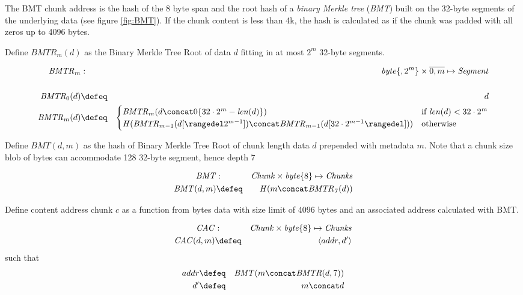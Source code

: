 The BMT chunk address is the hash of the 8 byte span and the root hash of a \emph{binary Merkle tree} (\emph{BMT}) built on the 32-byte segments of the underlying data (see figure \ref{fig:BMT}). If the chunk content is less than 4k, the hash is calculated as if the chunk was padded with all zeros up to 4096 bytes.


\begin{definition}
\label{def:bmtroot}
Define  $\mathit{BMTR}_m(d)$ as the Binary Merkle Tree Root of data $d$ fitting in at most $2^m$ 32-byte segments.

\begin{eqnarray}
\mathit{BMTR}_m&: &\mathit{byte}\{,2^{m}\}\times\overline{0,m} \mapsto \mathit{Segment} 
\\\\
\mathit{BMTR}_0(d) &\defeq &d\\
\mathit{BMTR}_m(d) &\defeq &\begin{cases}
\mathit{BMTR}_m(d\concat 0\{32\cdot 2^m-\mathit{len}(d)\})& \text{if }\mathit{len}(d)<32\cdot 2^{m} \\
\mathit{H}(\mathit{BMTR}_{m-1}(d[\rangedel 2^{m-1}])\concat  \mathit{BMTR}_{m-1}(d[32\cdot 2^{m-1}\rangedel])) & \text{otherwise }
\end{cases}
\end{eqnarray}
\end{definition}

\begin{definition}
\label{def:bmt}
Define  $\mathit{BMT}(d,m)$ as the hash of Binary Merkle Tree Root of chunk length data $d$ prepended with metadata $m$. Note that a chunk size blob of bytes can accommodate 128 32-byte segment, hence  depth $7$

\begin{eqnarray}
\mathit{BMT} &:&\mathit{Chunk}\times\mathit{byte}\{8\}\mapsto\mathit{Chunks}\\
\mathit{BMT}(d,m)&\defeq&\mathit{H}(m\concat \mathit{BMTR_7}(d))
\end{eqnarray}
\end{definition}

\begin{definition}
\label{def:cac}
Define content address chunk $c$ as a function from bytes data with size limit of 4096 bytes and an associated address calculated with BMT.

\begin{eqnarray}
\mathit{CAC} &:& \mathit{Chunk}\times\mathit{byte}\{8\}\mapsto\mathit{Chunks}\\
\mathit{CAC}(d,m)&\defeq&\langle addr,d'\rangle
\end{eqnarray}
such that
\begin{eqnarray}
addr&\defeq&\mathit{BMT}(m\concat\mathit{BMTR}(d,7))\\
d'&\defeq&m\concat d
\end{eqnarray}
\end{definition}

